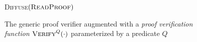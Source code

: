 \begin{figure}[t]
\begin{algorithm}[H]
    \caption{\label{alg.generic-verifier} The generic proof verifier augmented
        with a{ \em proof verification function} $\textsc{Verify}^Q(\cdot)$
        parameterized by a predicate $Q$}
    \begin{algorithmic}[1]
        \If{$\Pi \neq \emptyset$}
        \EndIf
            \State\textsc{Diffuse}{$(\textsc{ReadProof})$}
        \EndIf
        \vskip8pt
    \end{algorithmic}
\end{algorithm}
\end{figure}
